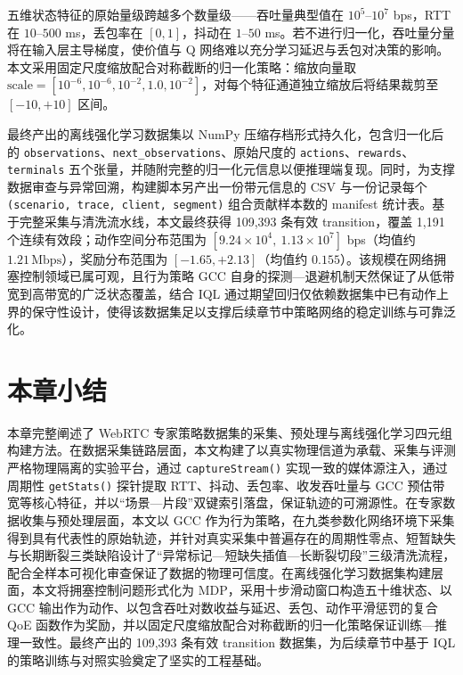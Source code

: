 五维状态特征的原始量级跨越多个数量级——吞吐量典型值在 $10^5$–$10^7$ bps，RTT 在 $10$–$500$ ms，丢包率在 $[0,1]$，抖动在 $1$–$50$ ms。若不进行归一化，吞吐量分量将在输入层主导梯度，使价值与 Q 网络难以充分学习延迟与丢包对决策的影响。本文采用固定尺度缩放配合对称截断的归一化策略：缩放向量取 $\mathrm{scale}=[10^{-6}, 10^{-6}, 10^{-2}, 1.0, 10^{-2}]$，对每个特征通道独立缩放后将结果裁剪至 $[-10, +10]$ 区间。

最终产出的离线强化学习数据集以 NumPy 压缩存档形式持久化，包含归一化后的 \texttt{observations}、\texttt{next\_observations}、原始尺度的 \texttt{actions}、\texttt{rewards}、\texttt{terminals} 五个张量，并随附完整的归一化元信息以便推理端复现。同时，为支撑数据审查与异常回溯，构建脚本另产出一份带元信息的 CSV 与一份记录每个 \texttt{(scenario, trace, client, segment)} 组合贡献样本数的 manifest 统计表。基于完整采集与清洗流水线，本文最终获得 109{,}393 条有效 transition，覆盖 1{,}191 个连续有效段；动作空间分布范围为 $[9.24\times10^4,\ 1.13\times10^7]$ bps（均值约 $1.21\,\text{Mbps}$），奖励分布范围为 $[-1.65, +2.13]$（均值约 $0.155$）。该规模在网络拥塞控制领域已属可观，且行为策略 GCC 自身的探测—退避机制天然保证了从低带宽到高带宽的广泛状态覆盖，结合 IQL 通过期望回归仅依赖数据集中已有动作上界的保守性设计，使得该数据集足以支撑后续章节中策略网络的稳定训练与可靠泛化。

\section{本章小结}
\label{sec:chapter3-summary}

本章完整阐述了 WebRTC 专家策略数据集的采集、预处理与离线强化学习四元组构建方法。在数据采集链路层面，本文构建了以真实物理信道为承载、采集与评测严格物理隔离的实验平台，通过 \texttt{captureStream()} 实现一致的媒体源注入，通过周期性 \texttt{getStats()} 探针提取 RTT、抖动、丢包率、收发吞吐量与 GCC 预估带宽等核心特征，并以“场景—片段”双键索引落盘，保证轨迹的可溯源性。在专家数据收集与预处理层面，本文以 GCC 作为行为策略，在九类参数化网络环境下采集得到具有代表性的原始轨迹，并针对真实采集中普遍存在的周期性零点、短暂缺失与长期断裂三类缺陷设计了“异常标记—短缺失插值—长断裂切段”三级清洗流程，配合全样本可视化审查保证了数据的物理可信度。在离线强化学习数据集构建层面，本文将拥塞控制问题形式化为 MDP，采用十步滑动窗口构造五十维状态、以 GCC 输出作为动作、以包含吞吐对数收益与延迟、丢包、动作平滑惩罚的复合 QoE 函数作为奖励，并以固定尺度缩放配合对称截断的归一化策略保证训练—推理一致性。最终产出的 109{,}393 条有效 transition 数据集，为后续章节中基于 IQL 的策略训练与对照实验奠定了坚实的工程基础。
